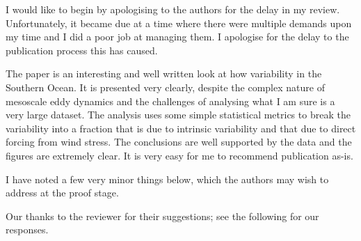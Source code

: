 \documentclass[11pt]{article}
\begin{document}
{\color{blue} I would like to begin by apologising to the authors for the delay in my review. Unfortunately, it became due at a time where there were multiple demands upon my time and I did a poor job at managing them. I apologise for the delay to the publication process this has caused.

The paper is an interesting and well written look at how variability in the Southern Ocean. It is presented very clearly, despite the complex nature of mesoscale eddy dynamics and the challenges of analysing what I am sure is a very large dataset. The analysis uses some simple statistical metrics to break the variability into a fraction that is due to intrinsic variability and that due to direct forcing from wind stress. The conclusions are well supported by the data and the figures are extremely clear. It is very easy for me to recommend publication as-is.

I have noted a few very minor things below, which the authors may wish to address at the proof stage.\\}

\noindent Our thanks to the reviewer for their suggestions; see the following for our responses.
\end{document}
